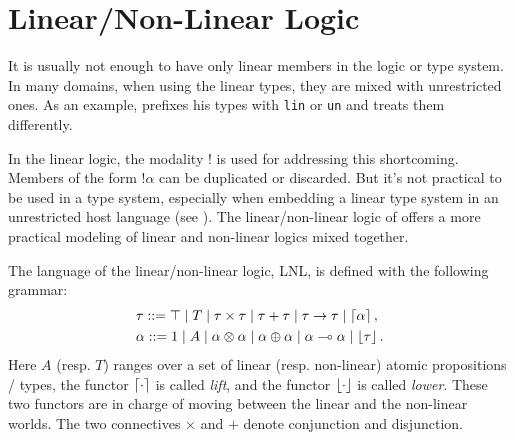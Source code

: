 \section{Linear/Non-Linear Logic}

It is usually not enough to have only linear members in the logic or type system. In many domains, when using the linear types, they are mixed with unrestricted ones. As an example, \cite{DavidWalker2004} prefixes his types with \texttt{lin} or \texttt{un} and treats them differently.

In the linear logic, the modality $!$ is used for addressing this shortcoming. Members of the form $!\alpha$ can be duplicated or discarded. But it's not practical to be used in a type system, especially when embedding a linear type system in an unrestricted host language (see \cite{JenniferPaykin2018}).
%
The linear/non-linear logic of \cite{DBLP:conf/csl/Benton94} offers a more practical modeling of linear and non-linear logics mixed together.

The language of the linear/non-linear logic, LNL, is defined with the following grammar:
\begin{align*}
    &\tau ::= \top \mid T \mid \tau \times \tau \mid \tau + \tau \mid \tau \rightarrow \tau \mid \left\lceil \alpha \right\rceil, \\
    &\alpha ::= 1 \mid A \mid \alpha \otimes \alpha \mid \alpha \oplus \alpha \mid \alpha \multimap \alpha \mid \left\lfloor \tau \right\rfloor.
\end{align*}
Here $A$ (resp. $T$) ranges over a set of linear (resp. non-linear) atomic propositions / types, the functor $\left\lceil \cdot \right\rceil$ is called \textit{lift}, and the functor $\left\lfloor \cdot \right\rfloor$ is called \textit{lower}. These two functors are in charge of moving between the linear and the non-linear worlds. The two connectives $\times$ and $+$ denote conjunction and disjunction.